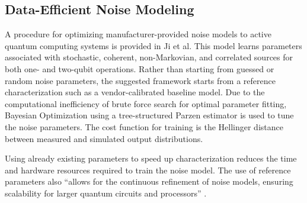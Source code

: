 \subsection{Data-Efficient Noise Modeling}
\label{sec:jiModeling}

A procedure for optimizing manufacturer-provided noise models to active quantum computing systems is provided in Ji et al.
This model learns parameters associated with stochastic, coherent, non-Markovian, and correlated sources for both one- and two-qubit operations. %
Rather than starting from guessed or random noise parameters, the suggested framework starts from a reference characterization such as a vendor-calibrated baseline model.
Due to the computational inefficiency of brute force search for optimal parameter fitting, Bayesian Optimization using a tree-structured Parzen estimator is used to tune the noise parameters.
The cost function for training is the Hellinger distance between measured and simulated output distributions.

Using already existing parameters to speed up characterization reduces the time and hardware resources required to train the noise model.
The use of reference parameters also ``allows for the continuous refinement of noise models, ensuring scalability for larger quantum circuits and processors'' \cite{ji_data-efficient_2025}.



% 

